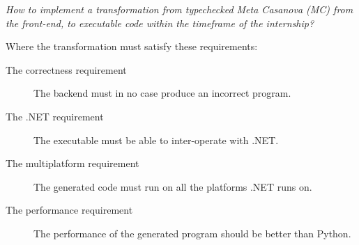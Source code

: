 \textit{How to implement a transformation from typechecked Meta Casanova (MC) from the front-end, to executable code within the timeframe of the internship?}

Where the transformation must satisfy these requirements:
\begin{description}
    \item[The correctness requirement] The backend must in no case produce an incorrect program.
    \item[The .NET requirement] The executable must be able to inter-operate with .NET.
    \item[The multiplatform requirement] The generated code must run on all the platforms .NET runs on.
    \item[The performance requirement] The performance of the generated program should be better than Python.
\end{description}
